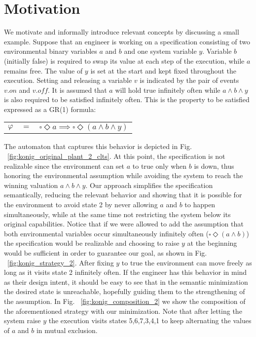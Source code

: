 \section{Motivation}\label{sec:motivation}
We motivate and informally introduce relevant concepts by discussing a small example. 
Suppose that an engineer is working on a specification consisting of two environmental 
binary variables $a$ and $b$ and one system variable $y$. Variable $b$ 
(initially false) is required to swap its value at each step of the execution, while $a$ 
remains free. The value of $y$ is set at the start and kept fixed throughout the 
execution. Setting and releasing a variable $v$ is indicated by the pair of events $v.on$ and $v.off$.
It is assumed that $a$ will hold true infinitely often while $a \wedge b \wedge y$ is also required to be satisfied infinitely often. This is the property to be satisfied expressed as a GR(1) formula: 
\begin{center}
	\begin{tabular}{ r c l }
		$\varphi$& $=$ &$\square \Diamond a\implies\square \Diamond (a \wedge b \wedge y)$\\
	\end{tabular}
\end{center}
The automaton that captures this behavior is depicted in Fig. ~\ref{fig:konig_original_plant_2_clts}. At this point, the specification is not realizable since the environment can set $a$ to true only when $b$ is down, thus honoring the environmental assumption while avoiding the system to reach the winning valuation $a \wedge b \wedge y$.  
Our approach simplifies the specification semantically, reducing the relevant behavior and showing that it is possible for the environment to avoid state 2 by never allowing $a$ and $b$ to happen simultaneously, while at the same time not restricting the system below its original capabilities.
 Notice that if we were allowed to add the assumption that both environmental variables occur simultaneously infinitely often ($\square \Diamond (a \wedge b)$) the specification would be realizable and choosing to raise $y$ at the beginning would be sufficient in order to guarantee our goal, as shown in Fig. ~\ref{fig:konig_strategy_2}. After fixing $y$ to true the environment can move freely as long as it visits state 2 infinitely often. If the engineer has this behavior in mind as their design intent, it should be easy to see that in the semantic minimization the desired state is unreachable, hopefully guiding them to the strengthening of the assumption.  In Fig. ~\ref{fig:konig_composition_2} we show the composition of the aforementioned strategy with our minimization. Note that after letting the system raise $y$ the execution visits states 5,6,7,3,4,1 to keep alternating the values of $a$ and $b$ in mutual exclusion.


